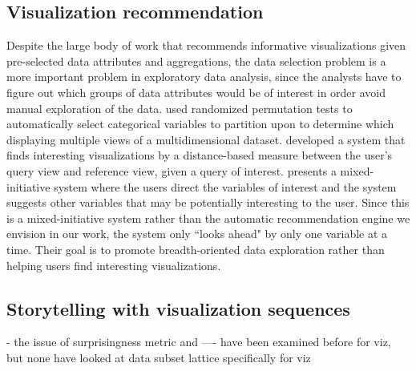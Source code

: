 \subsection{Visualization recommendation}
\par Despite the large body of work that recommends informative visualizations given pre-selected data attributes and aggregations, the data selection problem is a more important problem in exploratory data analysis, since the analysts have to figure out which groups of data attributes would be of interest in order avoid manual exploration of the data.   used randomized permutation tests to automatically select categorical variables to partition upon to determine which displaying multiple views of a multidimensional dataset.  developed a system that finds interesting visualizations by a distance-based measure between the user's query view and reference view,  given a query of interest. presents a mixed-initiative system where the users direct the variables of interest and the system suggests other variables that may be potentially interesting to the user. Since this is a mixed-initiative system rather than the automatic recommendation engine we envision in our work, the system only ``looks ahead"  by only one variable at a time. Their goal is to promote breadth-oriented data exploration rather than helping users find interesting visualizations.
\subsection{Storytelling with visualization sequences}
- the issue of surprisingness metric and ---- have been examined before for viz, but none have looked at data subset lattice specifically for viz